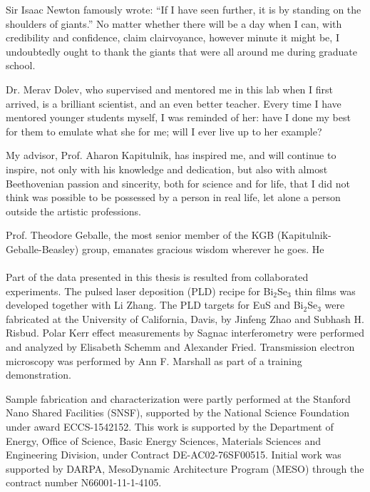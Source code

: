 Sir Isaac Newton famously wrote: ``If I have seen further, it is by standing on the shoulders of giants.'' No matter whether there will be a day when I can, with credibility and confidence, claim clairvoyance, however minute it might be, I undoubtedly ought to thank the giants that were all around me during graduate school.

Dr. Merav Dolev, who supervised and mentored me in this lab when I first arrived, is a brilliant scientist, and an even better teacher. Every time I have mentored younger students myself, I was reminded of her: have I done my best for them to emulate what she for me; will I ever live up to her example?

My advisor, Prof. Aharon Kapitulnik, has inspired me, and will continue to inspire, not only with his knowledge and dedication, but also with almost Beethovenian passion and sincerity, both for science and for life, that I did not think was possible to be possessed by a person in real life, let alone a person outside the artistic professions.

Prof. Theodore Geballe, the most senior member of the KGB (Kapitulnik-Geballe-Beasley) group, emanates gracious wisdom wherever he goes. He 

\paragraph{}Part of the data presented in this thesis is resulted from collaborated experiments. The pulsed laser deposition (PLD) recipe for Bi$_2$Se$_3$ thin films was developed together with Li Zhang. The PLD targets for EuS and Bi$_2$Se$_3$ were fabricated at the University of California, Davis, by Jinfeng Zhao and Subhash H. Risbud. Polar Kerr effect measurements by Sagnac interferometry were performed and analyzed by Elisabeth Schemm and Alexander Fried. Transmission electron microscopy was performed by Ann F. Marshall as part of a training demonstration.

Sample fabrication and characterization were partly performed at the Stanford Nano Shared Facilities (SNSF), supported by the National Science Foundation under award ECCS-1542152.  This work is supported by the Department of Energy,  Office of Science, Basic Energy Sciences, Materials Sciences and Engineering Division, under Contract DE-AC02-76SF00515. Initial work was supported by DARPA, MesoDynamic Architecture Program (MESO) through the contract number N66001-11-1-4105.